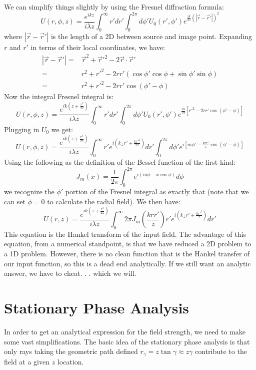 \documentclass[12pt]{revtex4-1}
\begin{document}
We can simplify things slightly by using the Fresnel diffraction formula:
\begin{equation}
U(r,\phi,z) = \frac{e^{ikz}}{i\lambda z}\int_0^\infty r'dr' \int_0^{2\pi} d\phi'  U_0(r',\phi')e^{\frac{ik}{2z}(|\vec{r}-\vec{r}'|)^2}
\end{equation}
where $|\vec{r}-\vec{r}'|$ is the length of a 2D between source and image point. Expanding $r$ and $r'$ in terms of their local coordinates, we have:
\begin{align}
|\vec{r}-\vec{r}'| =& \vec{r}^2 + \vec{r}'^2 -2\vec{r}\cdot\vec{r}'\\
			=& r^2+r'^2-2rr'(\cos\phi'\cos\phi + \sin\phi'\sin\phi)\\
			=& r^2+r'^2-2rr'\cos(\phi'-\phi)
\end{align}
Now the integral Fresnel integral is:
\begin{equation}
U(r,\phi,z) = \frac{e^{ik(z+\frac{r^2}{2z})}}{i\lambda z}\int_0^\infty r'dr' \int_0^{2\pi} d\phi'  U_0(r',\phi')e^{\frac{ik}{2z}[r'^2-2rr'\cos(\phi'-\phi)]}
\end{equation}
Plugging in $U_0$ we get:
\begin{equation}
U(r,\phi,z) = \frac{e^{ik(z+\frac{r^2}{2z})}}{i\lambda z}\int_0^\infty r' e^{i(k_{\perp}r' + \frac{kr'^2}{2z})}dr' \int_0^{2\pi} d\phi'  e^{i[m\phi'-\frac{krr'}{z}\cos(\phi'-\phi)]}
\end{equation}
Using the following as the definition of the Bessel function of the first kind:
\begin{equation}
J_m(x) = \frac{1}{2\pi}\int_{0}^{2\pi} e^{i(m\phi-x\cos\phi)}d\phi
\end{equation}
we recognize the $\phi'$ portion of the Fresnel integral as exactly that (note that we can set $\phi = 0$ to calculate the radial field). We then have:
\begin{equation}
U(r,z) = \frac{e^{ik(z+\frac{r^2}{2z})}}{i\lambda z}\int_0^\infty 2\pi J_m\left(\frac{krr'}{z}\right) r' e^{i(k_{\perp}r' + \frac{kr'^2}{z})}dr' 
\end{equation}
This equation is the Hankel transform of the input field. The advantage of this equation, from a numerical standpoint, is that we have reduced a 2D problem to a 1D problem. However, there is no clean function that is the Hankel transfer of our input function, so this is a dead end analytically. If we still want an analytic answer, we have to cheat. . . which we will.

\section{Stationary Phase Analysis}
In order to get an analytical expression for the field strength, we need to make some vast simplifications. The basic idea of the stationary phase analysis is that only rays taking the geometric path defined $r_\gamma = z\tan\gamma \approx z\gamma$ contribute to the field at a given $z$ location. 
\end{document}
